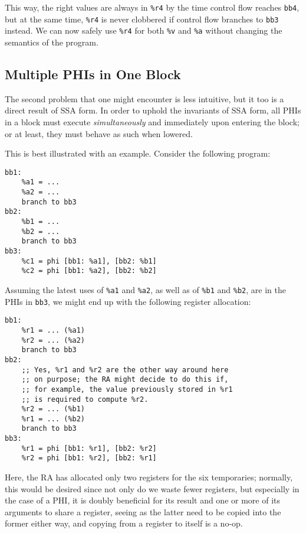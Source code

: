 \documentclass[12pt]{report}
\begin{document}
\noindent This way, the right values are always in \verb|%r4| by the time control flow reaches \verb|bb4|, but at the same time, \verb|%r4|
is never clobbered if control flow branches to \verb|bb3| instead. We can now safely use \verb|%r4| for both \verb|%v| and \verb|%a| without
changing the semantics of the program.

\subsection{Multiple PHIs in One Block}
The second problem that one might encounter is less intuitive, but it too is a direct result of SSA form. In order to uphold the invariants
of SSA form, all PHIs in a block must execute \textit{simultaneously} and immediately upon entering the block; or at least, they must
behave as such when lowered.

This is best illustrated with an example. Consider the following program:
\begin{Verbatim}
bb1:
    %a1 = ...
    %a2 = ...
    branch to bb3
bb2:
    %b1 = ...
    %b2 = ...
    branch to bb3
bb3:
    %c1 = phi [bb1: %a1], [bb2: %b1]
    %c2 = phi [bb1: %a2], [bb2: %b2]
\end{Verbatim}

\noindent Assuming the latest uses of \verb|%a1| and \verb|%a2|, as well as of \verb|%b1| and \verb|%b2|, are in the PHIs in \verb|bb3|, we
might end up with the following register allocation:
\begin{Verbatim}
bb1:
    %r1 = ... (%a1)
    %r2 = ... (%a2)
    branch to bb3
bb2:
    ;; Yes, %r1 and %r2 are the other way around here
    ;; on purpose; the RA might decide to do this if,
    ;; for example, the value previously stored in %r1
    ;; is required to compute %r2.
    %r2 = ... (%b1)
    %r1 = ... (%b2)
    branch to bb3
bb3:
    %r1 = phi [bb1: %r1], [bb2: %r2]
    %r2 = phi [bb1: %r2], [bb2: %r1]
\end{Verbatim}

\noindent Here, the RA has allocated only two registers for the six temporaries; normally, this would be desired since not only do we waste
fewer registers, but especially in the case of a PHI, it is doubly beneficial for its result and one or more of its arguments to share a
register, seeing as the latter need to be copied into the former either way, and copying from a register to itself is a no-op.
\end{document}
